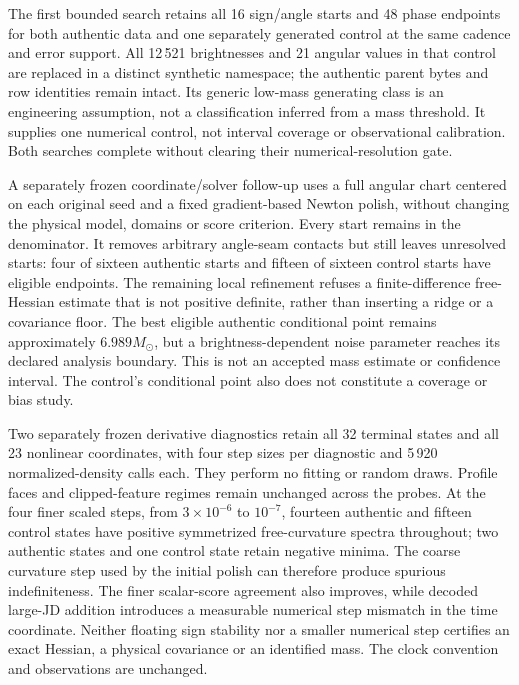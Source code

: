 The first bounded search retains all 16 sign/angle starts and 48 phase
endpoints for both authentic data and one separately generated control
at the same cadence and error support. All 12\,521 brightnesses and 21
angular values in that control are replaced in a distinct synthetic
namespace; the authentic parent bytes and row identities remain intact.
Its generic low-mass generating class is an engineering assumption,
not a classification inferred from a mass threshold. It supplies one
numerical control, not interval coverage or observational calibration.
Both searches complete without clearing their numerical-resolution gate.

A separately frozen coordinate/solver follow-up uses a full angular
chart centered on each original seed and a fixed gradient-based Newton
polish, without changing the physical model, domains or score criterion.
Every start remains in the denominator. It removes arbitrary angle-seam
contacts but still leaves unresolved starts: four of sixteen authentic
starts and fifteen of sixteen control starts have eligible endpoints.
The remaining local refinement refuses a finite-difference free-Hessian
estimate that is not positive definite, rather than inserting a ridge or
a covariance floor.
The best eligible authentic conditional point remains approximately
$6.989M_\odot$, but a brightness-dependent noise parameter reaches its
declared analysis boundary. This is not an accepted mass estimate or
confidence interval. The control's conditional point also does not
constitute a coverage or bias study.

Two separately frozen derivative diagnostics retain all 32 terminal states
and all 23 nonlinear coordinates, with four step sizes per diagnostic and
5\,920 normalized-density calls each. They perform no fitting or random
draws. Profile faces and clipped-feature regimes remain unchanged across
the probes. At the four finer scaled steps, from $3\times10^{-6}$ to
$10^{-7}$, fourteen authentic and fifteen control states have positive
symmetrized free-curvature spectra throughout; two authentic states and
one control state retain negative minima. The coarse curvature step used
by the initial polish can therefore produce spurious indefiniteness.
The finer scalar-score agreement also improves, while decoded large-JD
addition introduces a measurable numerical step mismatch in the time
coordinate. Neither floating sign stability nor a smaller numerical step
certifies an exact Hessian, a physical covariance or an identified mass.
The clock convention and observations are unchanged.

